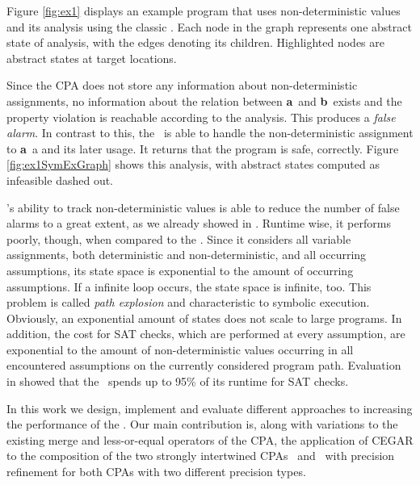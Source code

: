 Figure \ref{fig:ex1} displays an example program that uses non-deterministic values and its analysis using the classic .
Each node in the graph represents one abstract state of analysis, with the edges denoting its children. Highlighted nodes are abstract states at target locations.

Since the CPA does not store any information about non-deterministic assignments, no information about the relation between \textbf{a}\ and \textbf{b}\ exists and the property violation is reachable according to the analysis. This produces a \emph{false alarm}.
In contrast to this, the \symbolicExecutionCPA\ is able to handle the non-deterministic assignment to \textbf{a}\ a and its later usage. It returns that the program is safe, correctly.
Figure \ref{fig:ex1SymExGraph} shows this analysis, with abstract states computed as infeasible dashed out. 

\SymbolicExecutionCPA's ability to track non-deterministic values is able to reduce the number of false alarms to a great extent, as we already showed in \cite{Lemberger2015}.
Runtime wise, it performs poorly, though, when compared to the .
Since it considers all variable assignments, both deterministic and non-deterministic, and all occurring assumptions, its state space is exponential to the amount of occurring assumptions.
If a infinite loop occurs, the state space is infinite, too.
This problem is called \emph{path explosion} and characteristic to symbolic execution.\cite{Anand2008}
Obviously, an exponential amount of states does not scale to large programs.
In addition, the cost for SAT checks, which are performed at every assumption, are exponential to the amount of non-deterministic values occurring in all encountered assumptions on the currently considered program path.
Evaluation in \cite{Lemberger2015} showed that the \symbolicExecutionCPA\ spends up to 95\% of its runtime for SAT checks.

In this work we design, implement and evaluate different approaches to increasing the performance of the \symbolicExecutionCPA.
Our main contribution is, along with variations to the existing merge and less-or-equal operators of the CPA,
the application of CEGAR \cite{Clarke2003} to the composition of the two strongly intertwined CPAs \symbolicValueAnalysisCPA\ and \constraintsCPA\ with precision refinement for both CPAs
with two different precision types.

